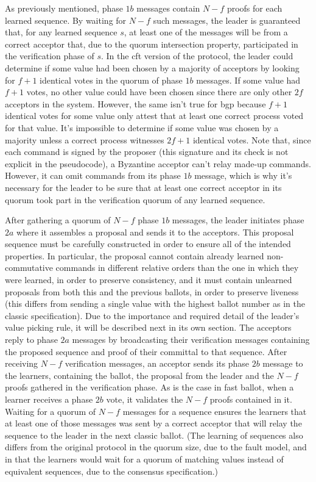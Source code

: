 As previously mentioned, phase $1b$ messages contain $N-f$ proofs for each learned sequence. By waiting for $N-f$ such messages, the leader is guaranteed that, for any learned sequence $s$, at least one of the messages will be from a correct acceptor that, due to the quorum intersection property, participated in the verification phase of $s$. In the \acrshort{cft} version of the protocol, the leader could determine if some value had been chosen by a majority of acceptors by looking for $f+1$ identical votes in the quorum of phase $1b$ messages. If some value had $f+1$ votes, no other value could have been chosen since there are only other $2f$ acceptors in the system. However, the same isn't true for \acrshort{bgp} because $f+1$ identical votes for some value only attest that at least one correct process voted for that value. It's impossible to determine if some value was chosen by a majority unless a correct process witnesses $2f+1$ identical votes. Note that, since each command is signed by the proposer (this signature and its check is not explicit in the pseudocode), a Byzantine acceptor can't relay made-up commands. However, it can omit commands from its phase $1b$ message, which is why it's necessary for the leader to be sure that at least one correct acceptor in its quorum took part in the verification quorum of any learned sequence. \par
After gathering a quorum of $N-f$ phase $1b$ messages, the leader initiates phase $2a$ where it assembles a proposal and sends it to the acceptors. This proposal sequence must be carefully constructed in order to ensure all of the intended properties. In particular, the proposal cannot contain already learned non-commutative commands in different relative orders than the one in which they were learned, in order to preserve consistency, and it must contain unlearned proposals from both this and the previous ballots, in order to preserve liveness (this differs from sending a single value with the highest ballot number as in the classic specification). Due to the importance and required detail of the leader's value picking rule, it will be described next in its own section. The acceptors reply to phase $2a$ messages by broadcasting their verification messages containing the proposed sequence and proof of their committal to that sequence. After receiving $N-f$ verification messages, an acceptor sends its phase $2b$ message to the learners, containing the ballot, the proposal from the leader and the $N-f$ proofs gathered in the verification phase. As is the case in fast ballot, when a learner receives a phase $2b$ vote, it validates the $N-f$ proofs contained in it. Waiting for a quorum of $N-f$ messages for a sequence ensures the learners that at least one of those messages was sent by a correct acceptor that will relay the sequence to the leader in the next classic ballot. (The learning of sequences also differs from the original protocol in the quorum size, due to the fault model, and in that the learners would wait for a quorum of matching values instead of equivalent sequences, due to the consensus specification.)\par

